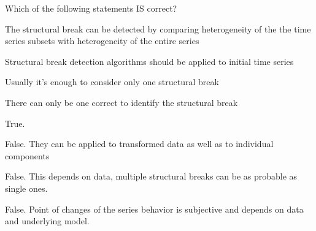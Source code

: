 
\begin{question}
Which of the following statements IS correct?
\begin{answerlist}
  \item The structural break can be detected by comparing heterogeneity of the the time series subsets with heterogeneity of the entire series
  \item Structural break detection algorithms should be applied to initial time series
  \item Usually it's enough to consider only one structural break
  \item There can only be one correct to identify the structural break
\end{answerlist}
\end{question}

\begin{solution}
\begin{answerlist}
  \item True.
  \item False. They can be applied to transformed data as well as to individual components
  \item False. This depends on data, multiple structural breaks can be as probable as single ones.
  \item False. Point of changes of the series behavior is subjective and depends on data and underlying model.
\end{answerlist}
\end{solution}

